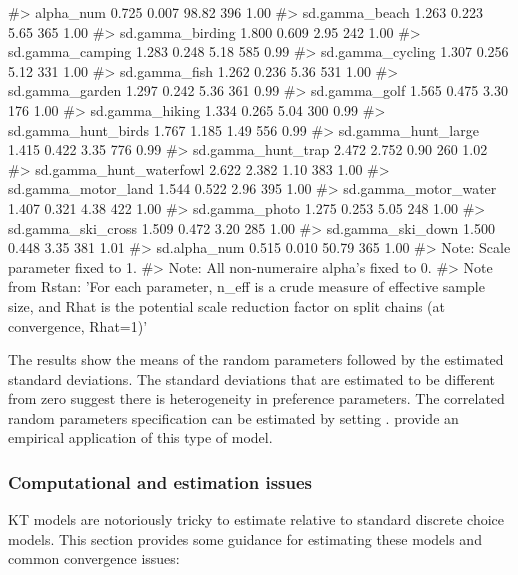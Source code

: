 \begin{Schunk}
\begin{Soutput}
#> alpha_num                  0.725   0.007  98.82   396 1.00
#> sd.gamma_beach             1.263   0.223   5.65   365 1.00
#> sd.gamma_birding           1.800   0.609   2.95   242 1.00
#> sd.gamma_camping           1.283   0.248   5.18   585 0.99
#> sd.gamma_cycling           1.307   0.256   5.12   331 1.00
#> sd.gamma_fish              1.262   0.236   5.36   531 1.00
#> sd.gamma_garden            1.297   0.242   5.36   361 0.99
#> sd.gamma_golf              1.565   0.475   3.30   176 1.00
#> sd.gamma_hiking            1.334   0.265   5.04   300 0.99
#> sd.gamma_hunt_birds        1.767   1.185   1.49   556 0.99
#> sd.gamma_hunt_large        1.415   0.422   3.35   776 0.99
#> sd.gamma_hunt_trap         2.472   2.752   0.90   260 1.02
#> sd.gamma_hunt_waterfowl    2.622   2.382   1.10   383 1.00
#> sd.gamma_motor_land        1.544   0.522   2.96   395 1.00
#> sd.gamma_motor_water       1.407   0.321   4.38   422 1.00
#> sd.gamma_photo             1.275   0.253   5.05   248 1.00
#> sd.gamma_ski_cross         1.509   0.472   3.20   285 1.00
#> sd.gamma_ski_down          1.500   0.448   3.35   381 1.01
#> sd.alpha_num               0.515   0.010  50.79   365 1.00
#> Note: Scale parameter fixed to 1. 
#> Note: All non-numeraire alpha's fixed to 0. 
#> Note from Rstan: 'For each parameter, n_eff is a crude measure of effective sample size, and Rhat is the potential scale reduction factor on split chains (at convergence, Rhat=1)'
\end{Soutput}
\end{Schunk}

The results show the means of the random parameters followed by the
estimated standard deviations. The standard deviations that are
estimated to be different from zero suggest there is heterogeneity in
preference parameters. The correlated random parameters specification
can be estimated by setting .
\citet{bhathousehold2006} provide an empirical application of this type
of model.

\hypertarget{computational-and-estimation-issues}{%
\subsubsection{Computational and estimation
issues}\label{computational-and-estimation-issues}}

KT models are notoriously tricky to estimate relative to standard
discrete choice models. This section provides some guidance for
estimating these models and common convergence issues:

